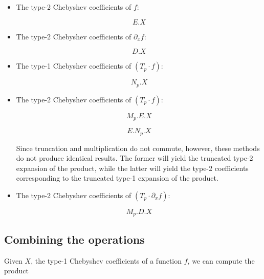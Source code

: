 \documentclass{article}
\begin{document}
\begin{itemize}
    \item The type-2 Chebyshev coefficients of $f$:
    
    \begin{equation*}
    E.X
    \end{equation*}
    
    \item The type-2 Chebyshev coefficients of $\partial_x f$:
    
    \begin{equation*}
    D.X
    \end{equation*}
    
    \item The type-1 Chebyshev coefficients of $(T_p \cdot f)$:
    
    \begin{equation*}
    N_p.X
    \end{equation*}
    
    \item The type-2 Chebyshev coefficients of $(T_p \cdot f)$:

    \begin{equation*}
    M_p.E.X
    \end{equation*}
    
    \begin{equation*}
    E.N_p.X
    \end{equation*}

    Since truncation and multiplication do not commute, however, these methods do not produce identical results.  The former will yield the truncated type-2 expansion of the product, while the latter will yield the type-2 coefficients corresponding to the truncated type-1 expansion of the product.  

    \item The type-2 Chebyshev coefficients of $(T_p \cdot \partial_x f)$:
    
    \begin{equation*}
    M_p.D.X
    \end{equation*}
\end{itemize}

\subsection{Combining the operations}

Given $X$, the type-1 Chebyshev coefficients of a function $f$, we can compute the product
\end{document}

